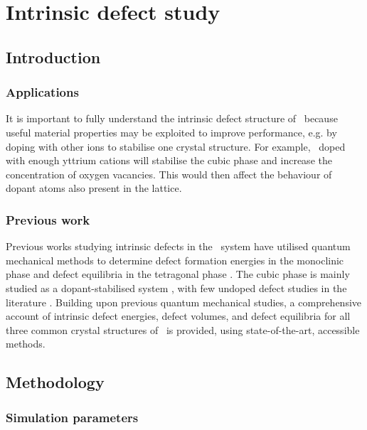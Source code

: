 \chapter{Intrinsic defect study}

\label{ch:results1} %

\section{Introduction} %
\subsection{Applications} %

It is important to fully understand the intrinsic defect structure of \zirconia\ because useful material properties may be exploited to improve performance, e.g. by doping with other ions to stabilise one crystal structure. For example, \zirconia\ doped with enough yttrium cations will stabilise the cubic phase and increase the concentration of oxygen vacancies. This would then affect the behaviour of dopant atoms also present in the lattice.

\subsection{Previous work} %

Previous works studying intrinsic defects in the \zirconia\ system have utilised quantum mechanical methods to determine defect formation energies in the monoclinic phase \cite{zheng2007first,foster2002modelling,foster2001structure} and defect equilibria in the tetragonal phase \cite{youssef2012intrinsic}. The cubic phase is mainly studied as a dopant-stabilised system \cite{orera1990intrinsic,jiang2011first}, with few undoped defect studies in the literature \cite{mackrodt1986theoretical,aarhammar2009energetics}. Building upon previous quantum mechanical studies, a comprehensive account of intrinsic defect energies, defect volumes, and defect equilibria for all three common crystal structures of \zirconia\ is provided, using state-of-the-art, accessible methods.

\section{Methodology}
\subsection{Simulation parameters}

